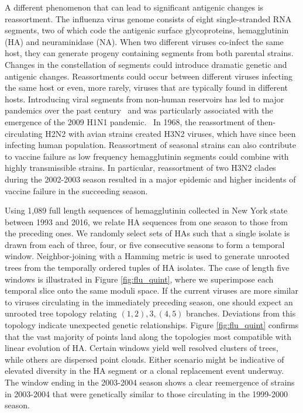 \documentclass[a4paper,11pt]{article}
\begin{document}
A different phenomenon that can lead to significant antigenic changes is reassortment.
The influenza virus genome consists of eight single-stranded RNA segments, two of which code the antigenic surface glycoproteins, hemagglutinin (HA) and neuraminidase (NA).
When two different viruses co-infect the same host, they can generate  progeny containing segments from both parental strains.
Changes in the constellation of segments could introduce dramatic genetic and antigenic changes.
Reassortments could occur between different viruses infecting the same host or even, more rarely, viruses that are typically found in different hosts.
Introducing viral segments from non-human reservoirs has led to major pandemics over the past century~\cite{rabadan2007evolution, rabadan2008non} and was particularly associated with the emergence of the 2009 H1N1 pandemic.~\cite{trifonov2009geographic, solovyov2009cluster}
In 1968, the reassortment of then-circulating H2N2 with avian strains created H3N2 viruses, which have since been infecting human population.
Reassortment of seasonal strains can also contribute to vaccine failure as low frequency hemagglutinin segments could combine with highly transmissible strains.
In particular, reassortment of two H3N2 clades during the 2002-2003 season resulted in a major epidemic and higher incidents of vaccine failure in the succeeding season.~\cite{centers2004preliminary}

Using 1,089 full length sequences of hemagglutinin collected in New York state between 1993 and 2016, we relate HA sequences from one season to those from the preceding ones.
We randomly select sets of HAs such that a single isolate is drawn from each of three, four, or five consecutive seasons to form a temporal window.
Neighbor-joining with a Hamming metric is used to generate unrooted trees from the temporally ordered tuples of HA isolates.
The case of length five windows is illustrated in Figure \ref{fig:flu_quint}, where we superimpose each temporal slice onto the same moduli space.
If the current viruses are more similar to viruses circulating in the immediately preceding season, one should expect an unrooted tree topology relating $(1,2),3,(4,5)$ branches. Deviations from this topology indicate unexpected genetic relationships. Figure \ref{fig:flu_quint} confirms that the vast majority of points land along the topologies most compatible with linear evolution of HA.
Certain windows yield well resolved clusters of trees, while others are dispersed point clouds.
Either scenario might be indicative of elevated diversity in the HA segment or a clonal replacement event underway.
The window ending in the 2003-2004 season shows a clear reemergence of strains in 2003-2004 that were genetically similar to those circulating in the 1999-2000 season.~\cite{holmes2005whole}
\end{document}
